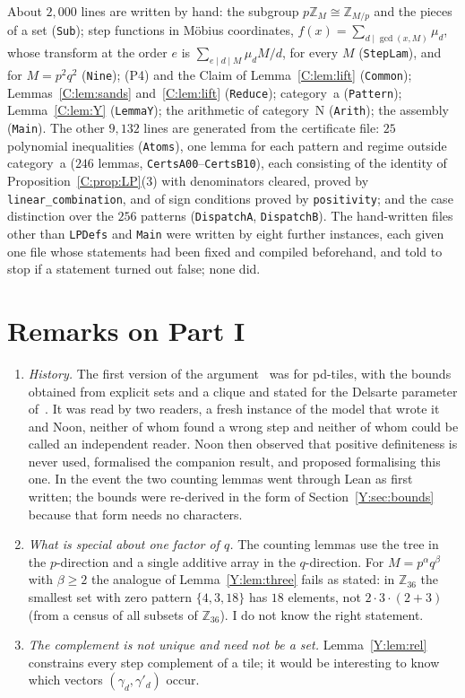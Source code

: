 \documentclass[11pt,a4paper]{amsart}
\theoremstyle{definition}
\theoremstyle{remark}
\newcommand{\Z}{\mathbb{Z}}
\newcommand{\lean}[1]{\texttt{#1}}
\newcommand{\gs}{\gamma}
\newcommand{\gd}{\gamma'}
\begin{document}
About $2{,}000$ lines are written by hand: the subgroup $p\Z_M\cong\Z_{M/p}$ and the pieces of a set
(\lean{Sub}); step functions in M\"obius coordinates, $f(x)=\sum_{d\mid\gcd(x,M)}\mu_d$, whose transform at the
order $e$ is $\sum_{e\mid d\mid M}\mu_dM/d$, for every $M$ (\lean{StepLam}), and for $M=p^2q^2$ (\lean{Nine});
(P4) and the Claim of Lemma~\ref{C:lem:lift} (\lean{Common}); Lemmas~\ref{C:lem:sands} and~\ref{C:lem:lift}
(\lean{Reduce}); category~a (\lean{Pattern}); Lemma~\ref{C:lem:Y} (\lean{LemmaY}); the arithmetic of category~N
(\lean{Arith}); the assembly (\lean{Main}). The other $9{,}132$ lines are generated from the certificate file:
$25$ polynomial inequalities (\lean{Atoms}), one lemma for each pattern and regime outside category~a ($246$ lemmas,
\lean{CertsA00}--\lean{CertsB10}), each consisting of the identity of Proposition~\ref{C:prop:LP}(3) with
denominators cleared, proved by \lean{linear\_combination}, and of sign conditions proved by \lean{positivity};
and the case distinction over the $256$ patterns (\lean{DispatchA}, \lean{DispatchB}). The hand-written files
other than \lean{LPDefs} and \lean{Main} were written by eight further instances, each given one file whose
statements had been fixed and compiled beforehand, and told to stop if a statement turned out false; none did.

\section{Remarks on Part I}

\begin{enumerate}
\item \emph{History.} The first version of the argument~\cite{Ynote} was for pd-tiles, with the bounds
obtained from explicit sets and a clique and stated for the Delsarte parameter of~\cite{KLMS}. It was read by
two readers, a fresh instance of the model that wrote it and Noon, neither of whom found a wrong step and
neither of whom could be called an independent reader. Noon then observed that positive definiteness is never used, formalised the
companion result, and proposed formalising this one. In the event the two counting lemmas went through Lean
as first written; the bounds were re-derived in the form of Section~\ref{Y:sec:bounds} because that form needs
no characters.
\item \emph{What is special about one factor of $q$.} The counting lemmas use the tree in the $p$-direction
and a single additive array in the $q$-direction. For $M=p^\alpha q^\beta$ with $\beta\ge2$ the analogue of
Lemma~\ref{Y:lem:three} fails as stated: in $\Z_{36}$ the smallest set with zero pattern $\{4,3,18\}$ has
$18$ elements, not $2\cdot3\cdot(2+3)$ (from a census of all subsets of $\Z_{36}$). I do not know the right
statement.
\item \emph{The complement is not unique and need not be a set.} Lemma~\ref{Y:lem:rel} constrains every step
complement of a tile; it would be interesting to know which vectors $(\gs_d,\gd_d)$ occur.
\end{enumerate}
\end{document}
